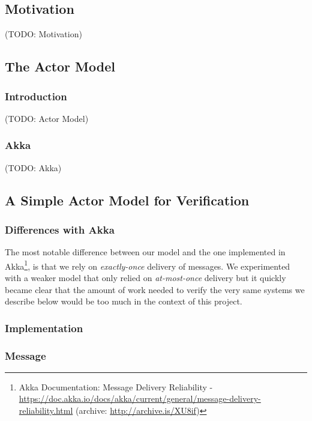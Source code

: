 \documentclass[a4paper,twoside]{article}
\newcommand{\TODO}[1]{\textcolor{YellowOrange}{(TODO: #1)}} %
\begin{document}
\subsection{Motivation}

\TODO{Motivation}

\subsection{The Actor Model}

\subsubsection{Introduction}

\TODO{Actor Model}

\subsubsection{Akka}

\TODO{Akka}

\subsection{A Simple Actor Model for Verification}

\subsubsection{Differences with Akka}

The most notable difference between our model and the one implemented in Akka\footnote{Akka Documentation: Message Delivery Reliability - \url{https://doc.akka.io/docs/akka/current/general/message-delivery-reliability.html} (archive: \url{http://archive.is/XU8if})}, is that we rely on \textit{exactly-once} delivery of messages. We experimented with a weaker model that only relied on \textit{at-most-once} delivery but it quickly became clear that the amount of work needed to verify the very same systems we describe below would be too much in the context of this project.

\subsubsection{Implementation}

\subsubsection*{Message}
\end{document}
